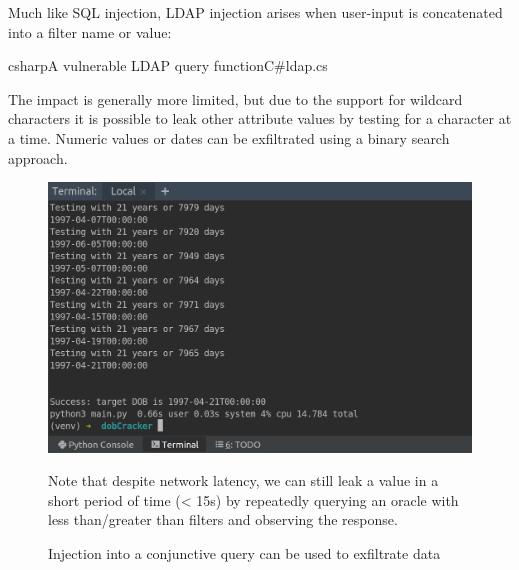 Much like SQL injection, LDAP injection arises when user-input is concatenated into a filter name or value:

\newsavebox\myva
\begin{lrbox}{\myva}\begin{minipage}{\textwidth}
    \begin{mycodefile}{csharp}{\label{code:motivating:ldap:1}A vulnerable LDAP query function}{C\#}{ldap.cs}\end{mycodefile}
\end{minipage}\end{lrbox}



The impact is generally more limited, but due to the support for wildcard characters it is possible to leak other
attribute values by testing for a character at a time.
Numeric values or dates can be exfiltrated using a binary search approach.

\begin{figure}[H]
    \begin{MyMdframed}
        \vspace{0.5em}


        \caption{Injection into a conjunctive query can be used to exfiltrate data}
        \vspace{0.5em}
        \captionsetup{style=default}

        \begin{adjustbox}{center}\includegraphics[width=0.75\linewidth]{dobcrack.png}\end{adjustbox}

        \vspace{0.5em}

        Note that despite network latency, we can still leak a value in a short period of time (< 15s) by
        repeatedly querying an oracle with less than/greater than filters and observing the response.
    \end{MyMdframed}
\end{figure}

